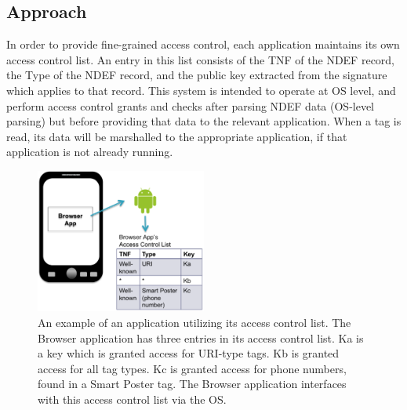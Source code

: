 \documentclass[12pt]{article}
\begin{document}
\subsection{Approach}
In order to provide fine-grained access control, each application maintains its own access control list.
An entry in this list consists of the TNF of the NDEF record, the Type of the NDEF record, and the public key extracted from the signature which applies to that record.
This system is intended to operate at OS level, and perform access control grants and checks after parsing NDEF data (OS-level parsing) but before providing that data to the relevant application.
When a tag is read, its data will be marshalled to the appropriate application, if that application is not already running.
\begin{figure}[h!]
\begin{minipage}{\textwidth}
	\centering
		\includegraphics[width=0.5\textwidth]{ACL_image.png}
	\caption[Caption for LOF]%
    {An example of an application utilizing its access control list. The Browser application has three entries in its access control list. Ka is a key which is granted access for URI-type tags. Kb is granted access for all tag types. Kc is granted access for phone numbers, found in a Smart Poster tag. The Browser application interfaces with this access control list via the OS.}

\end{minipage} 
\end{figure}
\end{document}
